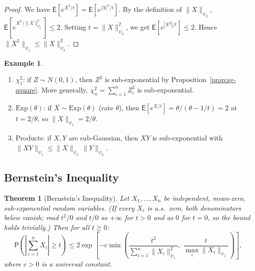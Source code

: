 \documentclass[14pt]{extarticle}
\theoremstyle{plain}
\newtheorem{theorem}{Theorem}[section]
\theoremstyle{definition}
\newtheorem{example}{Example}[section]
\theoremstyle{remark}
\newcommand\expc{\mathsf{E}}
\newcommand\prb{\mathsf{P}}
\begin{document}
\begin{proof}
We have $\expc[e^{X^2/t}] = \expc[e^{|X|^2/t}]$. By the definition of $\|X\|_{\psi_2}$, $\expc[e^{X^2/\|X\|_{\psi_2}^2}] \leqslant 2$. Setting $t = \|X\|_{\psi_2}^2$, we get $\expc[e^{|X^2|/t}] \leqslant 2$. Hence $\|X^2\|_{\psi_1} \leqslant \|X\|_{\psi_2}^2$.
\end{proof}

\begin{example}\label{ex:subexp}
\leavevmode
\begin{enumerate}[label=\textup{(\arabic*)}]
\item $\chi^2_1$: if $Z \sim N(0,1)$, then $Z^2$ is sub-exponential by Proposition~\ref{prop:sg-square}. More generally, $\chi^2_n = \sum_{i=1}^n Z_i^2$ is sub-exponential.
\item $\mathrm{Exp}(\theta)$: if $X \sim \mathrm{Exp}(\theta)$ (rate $\theta$), then $\expc[e^{X/t}] = \theta/(\theta - 1/t) = 2$ at $t = 2/\theta$, so $\|X\|_{\psi_1} = 2/\theta$.
\item Products: if $X, Y$ are sub-Gaussian, then $XY$ is sub-exponential with $\|XY\|_{\psi_1} \leqslant \|X\|_{\psi_2}\,\|Y\|_{\psi_2}$.
\end{enumerate}
\end{example}

\subsection{Bernstein's Inequality}

\begin{theorem}[Bernstein's Inequality]\label{thm:bernstein}
Let $X_1, \ldots, X_n$ be independent, mean-zero, sub-exponential random variables. (If every $X_i$ is a.s.\ zero, both denominators below vanish; read $t^2/0$ and $t/0$ as $+\infty$ for $t > 0$ and as $0$ for $t = 0$, so the bound holds trivially.) Then for all $t \geqslant 0$:
\begin{equation}\label{eq:bernstein}
\boxed{\prb\!\left(\left|\sum_{i=1}^n X_i\right| \geqslant t\right) \leqslant 2\exp\!\left[-c\min\!\left(\frac{t^2}{\sum_{i=1}^n \|X_i\|_{\psi_1}^2},\; \frac{t}{\max_i \|X_i\|_{\psi_1}}\right)\right],}
\end{equation}
where $c > 0$ is a universal constant.
\end{theorem}
\end{document}
